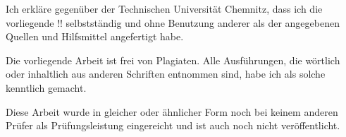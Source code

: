 \begin{tucerklaerung}
Ich erkläre gegenüber der Technischen Universität Chemnitz, dass
ich die vorliegende !! selbstständig und ohne Benutzung
anderer als der angegebenen Quellen und Hilfsmittel angefertigt
habe.

Die vorliegende Arbeit ist frei von Plagiaten. Alle
Ausführungen, die wörtlich oder inhaltlich aus anderen Schriften
entnommen sind, habe ich als solche kenntlich gemacht.

Diese Arbeit wurde in gleicher oder ähnlicher Form noch bei
keinem anderen Prüfer als Prüfungsleistung eingereicht und ist
auch noch nicht veröffentlicht.

\end{tucerklaerung}
